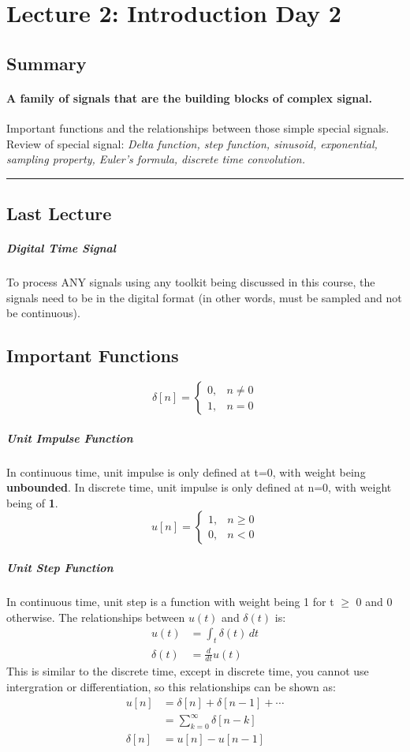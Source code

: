 \section*{Lecture 2: Introduction Day 2}
\subsection*{Summary}
\paragraph{A family of signals that are the building blocks of complex signal.}
Important functions and the relationships between those simple special signals. \\Review of special signal: \textit{Delta function, step function, sinusoid, exponential, sampling property, Euler's formula, discrete time convolution.}
\vspace{5pt}
\hrule
\subsection*{Last Lecture}
\subparagraph*{Digital Time Signal} To process ANY signals using any toolkit being discussed in this course, the signals need to be in the digital format (in other words, must be sampled and not be continuous).

\subsection*{Important Functions}
\[
  \delta[n] =
  \begin{cases}
    0, & n\neq 0 \\
    1, & n=0
  \end{cases}
\]
\subparagraph*{Unit Impulse Function} In continuous time, unit impulse is only defined at t=0, with weight being \textbf{unbounded}. In discrete time, unit impulse is only defined at n=0, with weight being of \textbf{1}. 
\[
  u[n] = 
  \begin{cases}
      1, & n\geq 0\\
      0, & n< 0
  \end{cases}
\]
\subparagraph*{Unit Step Function} In continuous time, unit step is a function with weight being 1 for t $\geq$ 0 and 0 otherwise. The relationships between $u(t)$ and $\delta(t)$ is:
\begin{align}
    u(t) &= \int_{t}^{} \delta(t) \,dt  \\
    \delta(t) &= \frac{d}{dt}u(t)
\end{align}
This is similar to the discrete time, except in discrete time, you cannot use intergration or differentiation, so this relationships can be shown as:
\begin{align*}
    u[n] &= \delta[n]+\delta[n-1]+\cdots \\
         &= \sum_{k=0}^{\infty} \delta[n-k] \\
    \delta[n] &= u[n]-u[n-1]      
\end{align*}
